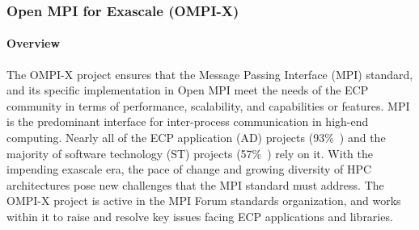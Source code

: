 \subsubsection{ Open MPI for Exascale (OMPI-X)}\label{subsubsect:openmpi}



\paragraph{Overview}

The OMPI-X project ensures that the Message Passing Interface (MPI)
standard, and its specific implementation in Open MPI meet the needs
of the ECP community in terms of performance, scalability, and
capabilities or features. MPI is the predominant interface for
inter-process communication in high-end computing.  Nearly all of the
ECP application (AD) projects (93\%~\cite{Bernholdt:2017:smu-talk})
and the majority of software technology (ST) projects
(57\%~\cite{Bernholdt:2017:smu-talk}) rely on it.
With the impending exascale era, the
pace of change and growing diversity of HPC architectures pose new
challenges that the MPI standard must address.  The OMPI-X project is
active in the MPI Forum standards organization, and works within it to
raise and resolve key issues facing ECP applications and libraries.

